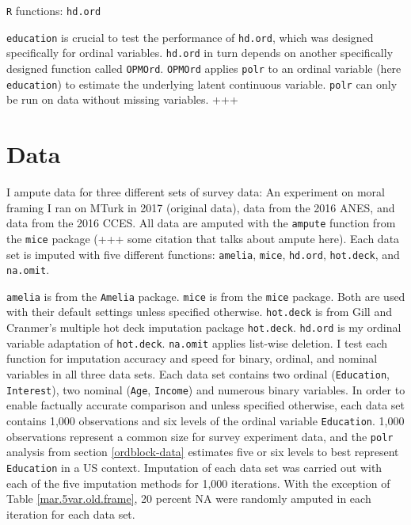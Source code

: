 \documentclass[12pt,econ]{sources/authesis}
\begin{document}
\texttt{R} functions: \texttt{hd.ord}

\texttt{education} is crucial to test the performance of \texttt{hd.ord}, which was designed specifically for ordinal variables. \texttt{hd.ord} in turn depends on another specifically designed function called \texttt{OPMOrd}. \texttt{OPMOrd} applies \texttt{polr} to an ordinal variable (here \texttt{education}) to estimate the underlying latent continuous variable. \texttt{polr} can only be run on data without missing variables. +++

\hypertarget{ordmiss-data}{%
\section{Data}\label{ordmiss-data}}

I ampute data for three different sets of survey data: An experiment on moral framing I ran on MTurk in 2017 (original data), data from the 2016 ANES, and data from the 2016 CCES. All data are amputed with the \texttt{ampute} function from the \texttt{mice} package (+++ some citation that talks about ampute here). Each data set is imputed with five different functions: \texttt{amelia}, \texttt{mice}, \texttt{hd.ord}, \texttt{hot.deck}, and \texttt{na.omit}.

\texttt{amelia} is from the \texttt{Amelia} package. \texttt{mice} is from the \texttt{mice} package. Both are used with their default settings unless specified otherwise. \texttt{hot.deck} is from Gill and Cranmer's multiple hot deck imputation package \texttt{hot.deck}. \texttt{hd.ord} is my ordinal variable adaptation of \texttt{hot.deck}. \texttt{na.omit} applies list-wise deletion. I test each function for imputation accuracy and speed for binary, ordinal, and nominal variables in all three data sets. Each data set contains two ordinal (\texttt{Education}, \texttt{Interest}), two nominal (\texttt{Age}, \texttt{Income}) and numerous binary variables. In order to enable factually accurate comparison and unless specified otherwise, each data set contains 1,000 observations and six levels of the ordinal variable \texttt{Education}. 1,000 observations represent a common size for survey experiment data, and the \texttt{polr} analysis from section \ref{ordblock-data} estimates five or six levels to best represent \texttt{Education} in a US context. Imputation of each data set was carried out with each of the five imputation methods for 1,000 iterations. With the exception of Table \ref{mar.5var.old.frame}, 20 percent NA were randomly amputed in each iteration for each data set.
\end{document}
